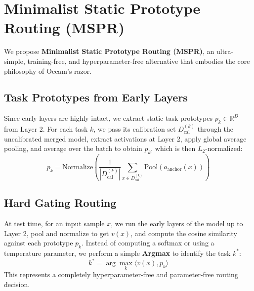 \documentclass{article}
\theoremstyle{plain}
\theoremstyle{definition}
\theoremstyle{remark}
\begin{document}
\section{Minimalist Static Prototype Routing (MSPR)}
We propose \textbf{Minimalist Static Prototype Routing (MSPR)}, an ultra-simple, training-free, and hyperparameter-free alternative that embodies the core philosophy of Occam's razor.

\subsection{Task Prototypes from Early Layers}
Since early layers are highly intact, we extract static task prototypes $p_k \in \mathbb{R}^D$ from Layer 2. For each task $k$, we pass its calibration set $D_{\text{cal}}^{(k)}$ through the uncalibrated merged model, extract activations at Layer 2, apply global average pooling, and average over the batch to obtain $p_k$, which is then $L_2$-normalized:
\begin{equation}
p_k = \text{Normalize}\left( \frac{1}{|D_{\text{cal}}^{(k)}|} \sum_{x \in D_{\text{cal}}^{(k)}} \text{Pool}(a_{\text{anchor}}(x)) \right)
\end{equation}

\subsection{Hard Gating Routing}
At test time, for an input sample $x$, we run the early layers of the model up to Layer 2, pool and normalize to get $v(x)$, and compute the cosine similarity against each prototype $p_k$. Instead of computing a softmax or using a temperature parameter, we perform a simple \textbf{Argmax} to identify the task $k^*$:
\begin{equation}
k^* = \arg\max_k \langle v(x), p_k \rangle
\end{equation}
This represents a completely hyperparameter-free and parameter-free routing decision.
\end{document}
